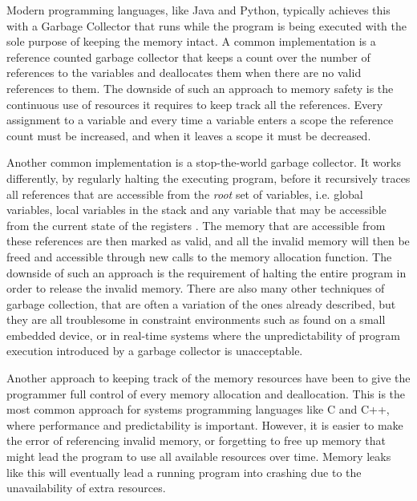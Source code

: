 Modern programming languages, like Java and Python, typically achieves this with a Garbage Collector that runs while the program is being executed with the sole purpose of keeping the memory intact.
A common implementation is a reference counted garbage collector that keeps a count over the number of references to the variables and deallocates them when there are no valid references to them.
The downside of such an approach to memory safety is the continuous use of resources it requires to keep track all the references.
Every assignment to a variable and every time a variable enters a scope the reference count must be increased, and when it leaves a scope it must be decreased.

Another common implementation is a stop-the-world garbage collector.
It works differently, by regularly halting the executing program, before it recursively traces all references that are accessible from the \emph{root} set of variables, i.e. global variables, local variables in the stack and any variable that may be accessible from the current state of the registers \cite{Wilson1992}.
The memory that are accessible from these references are then marked as valid, and all the invalid memory will then be freed and accessible through new calls to the memory allocation function.
The downside of such an approach is the requirement of halting the entire program in order to release the invalid memory.
There are also many other techniques of garbage collection, that are often a variation of the ones already described, but they are all troublesome in constraint environments such as found on a small embedded device, or in real-time systems where the unpredictability of program execution introduced by a garbage collector is unacceptable.

Another approach to keeping track of the memory resources have been to give the programmer full control of every memory allocation and deallocation.
This is the most common approach for systems programming languages like C and C++, where performance and predictability is important.
However, it is easier to make the error of referencing invalid memory, or forgetting to free up memory that might lead the program to use all available resources over time.
Memory leaks like this will eventually lead a running program into crashing due to the unavailability of extra resources.


